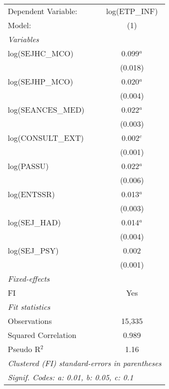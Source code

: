 
\begingroup
\centering
\begin{tabular}{lc}
   \tabularnewline \midrule \midrule
   Dependent Variable: & log(ETP\_INF)\\   
   Model:              & (1)\\  
   \midrule
   \emph{Variables}\\
   log(SEJHC\_MCO)     & 0.099$^{a}$\\   
                       & (0.018)\\   
   log(SEJHP\_MCO)     & 0.020$^{a}$\\   
                       & (0.004)\\   
   log(SEANCES\_MED)   & 0.022$^{a}$\\   
                       & (0.003)\\   
   log(CONSULT\_EXT)   & 0.002$^{c}$\\   
                       & (0.001)\\   
   log(PASSU)          & 0.022$^{a}$\\   
                       & (0.006)\\   
   log(ENTSSR)         & 0.013$^{a}$\\   
                       & (0.003)\\   
   log(SEJ\_HAD)       & 0.014$^{a}$\\   
                       & (0.004)\\   
   log(SEJ\_PSY)       & 0.002\\   
                       & (0.001)\\   
   \midrule
   \emph{Fixed-effects}\\
   FI                  & Yes\\  
   \midrule
   \emph{Fit statistics}\\
   Observations        & 15,335\\  
   Squared Correlation & 0.989\\  
   Pseudo R$^2$        & 1.16\\  
   \midrule \midrule
   \multicolumn{2}{l}{\emph{Clustered (FI) standard-errors in parentheses}}\\
   \multicolumn{2}{l}{\emph{Signif. Codes: a: 0.01, b: 0.05, c: 0.1}}\\
\end{tabular}
\par\endgroup



